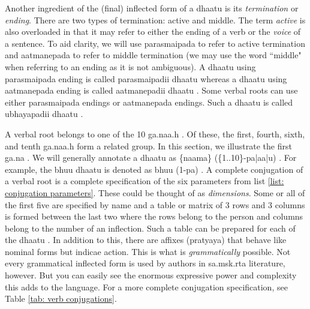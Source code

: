 \documentclass[a4paper, 12pt]{article}
\newcommand \sans[1]{
    \textsanskrit{#1}
}
\begin{document}
Another ingredient of the (final) inflected form of a \sans{dhaatu} is its \emph{termination} or \emph{ending}. There are two types of termination: active and middle. The term \emph{active} is also overloaded in that it may refer to either the ending of a verb or the \emph{voice} of a sentence. To aid clarity, we will use \sans{parasmaipada} to refer to active termination and \sans{aatmanepada} to refer to middle termination (we may use the word ``middle" when referring to an ending as it is not ambiguous). A \sans{dhaatu} using \sans{parasmaipada} ending is called \sans{parasmaipadii dhaatu} whereas a \sans{dhaatu} using \sans{aatmanepada} ending is called \sans{aatmanepadii dhaatu}. Some verbal roots can use either \sans{parasmaipada} endings or \sans{aatmanepada} endings. Such a \sans{dhaatu} is called \sans{ubhayapadii dhaatu}.

A verbal root belongs to one of the 10 \sans{ga.naa.h}. Of these, the first, fourth, sixth, and tenth \sans{ga.naa.h} form a related group. In this section, we illustrate the first \sans{ga.na}.  We will generally annotate a \sans{dhaatu} as \sans{\{naama\} (\{1..10\}-pa|aa|u)}. For example, the \sans{bhuu dhaatu} is denoted as \sans{bhuu (1-pa)}. A complete conjugation of a verbal root is a complete specification of the six parameters from list \ref{list: conjugation parameters}. These could be thought of as \emph{dimensions}. Some or all of the first five are specified by name and a table or matrix of 3 rows and 3 columns is formed between the last two where the rows belong to the person and columns belong to the number of an inflection. Such a table can be prepared for each of the \sans{dhaatu}. In addition to this, there are affixes \sans{(pratyaya)} that behave like nominal forms but indicae action. This is what is \emph{grammatically} possible. Not every grammatical inflected form is used by authors in \sans{sa.msk.rta} literature, however.  But you can easily see the enormous expressive power and complexity this adds to the language. For a more complete conjugation specification, see Table \ref{tab: verb conjugations}.
\end{document}
